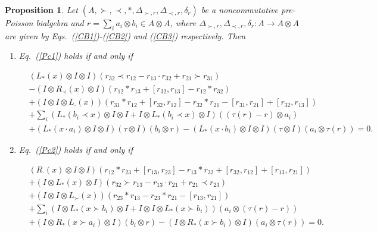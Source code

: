 \documentclass[12pt]{amsart}
\newtheorem{pro}[thm]{Proposition}
\theoremstyle{definition}
\begin{document}
\begin{pro} \label{Ac3}
Let $(A,\succ,\prec,\ast,\Delta_{\succ,r},\Delta_{\prec,r},\delta_{r})$ be a noncommutative pre-Poisson bialgebra
and $r=\sum\limits_{i}a_{i}\otimes b_{i}\in A\otimes A$, where
$\Delta_{\succ,r},\Delta_{\prec,r},\delta_r:A\longrightarrow A\otimes A$ are given by Eqs.~(\ref{CB1})-(\ref{CB2}) and
(\ref{CB3}) respectively. Then
\begin{enumerate}
\item \label{CNPB1} Eq.~(\ref{Pc1}) holds if and only if
\begin{small}
\begin{align}\label{CA1}&
(L_{\ast}(x)\otimes I \otimes I)(r_{32}\prec r_{12}-r_{13}\cdot r_{32}+r_{21}\succ r_{31})
\\&-(I\otimes R_{\prec}(x)\otimes I)(r_{12}\ast r_{13}+[r_{32},r_{13}]-r_{12}\ast r_{32})
\nonumber\\&+(I\otimes I \otimes L_{\cdot}(x))(r_{31}\ast r_{12}+[r_{32},r_{12}]-r_{32}\ast r_{21}-[r_{31},r_{21}]+[r_{32},r_{13}])
\nonumber\\&+\sum_{i}(L_{\ast}(b_i\prec x)\otimes I \otimes I +I \otimes L_{\ast}(b_i\prec x)\otimes I)((\tau(r)-r)\otimes a_i)
\nonumber\\&+(L_{\ast}( x\cdot a_i )\otimes I \otimes I)(\tau\otimes I)(b_i\otimes r) -
(L_{\ast}( x\cdot b_i )\otimes I \otimes I)(\tau\otimes I)(a_i\otimes \tau(r))
=0.\nonumber\end{align}\end{small}

\item \label{CNPB2}
	 Eq.~(\ref{Pc2}) holds if and only if
\begin{small}
\begin{align}\label{CA2}&
(R_{\cdot}(x)\otimes I\otimes I)(r_{12}\ast r_{23}+[r_{13},r_{23}]-r_{13}\ast r_{32}+[r_{32},r_{12}]+[r_{13},r_{21}])
\\&+(I \otimes L_{\ast}(x)\otimes I)(r_{32}\succ r_{13}-r_{13}\cdot r_{21}+r_{21}\prec r_{23})
\nonumber\\&+(I \otimes I\otimes L_{\succ}(x))(r_{23}\ast r_{13}-r_{23}\ast r_{21}-[r_{13}, r_{21}])
\nonumber\\&+\sum_{i}(I \otimes L_{\ast}( x\succ b_i)\otimes I+I \otimes I\otimes  L_{\ast}( x\succ b_i))(a_i\otimes(\tau(r)-r))
\nonumber\\&+(I \otimes R_{\ast}( x\succ a_i)\otimes I)(b_i\otimes r)-(I \otimes R_{\ast}( x\succ b_i)\otimes I)(a_i\otimes \tau(r))
=0.\nonumber
\end{align}\end{small}


\end{enumerate}
\end{pro}
\end{document}
